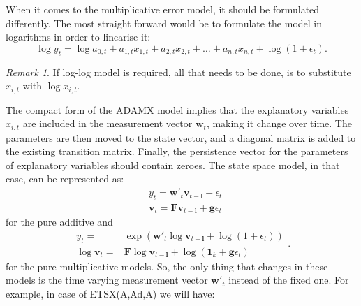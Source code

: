 \documentclass[
]{book}
\theoremstyle{definition}
\theoremstyle{definition}
\theoremstyle{definition}
\theoremstyle{definition}
\theoremstyle{remark}
\newtheorem*{remark}{Remark}
\begin{document}
When it comes to the multiplicative error model, it should be formulated differently. The most straight forward would be to formulate the model in logarithms in order to linearise it:
\begin{equation}
  \log {y}_{t} = \log a_{0,t} + a_{1,t} x_{1,t} + a_{2,t} x_{2,t} + \dots + a_{n,t} x_{n,t} + \log(1+ \epsilon_t).
  \label{eq:ETSXADAMStateSpacePureMultiplicativeMeasurement}
\end{equation}

\begin{remark}
If log-log model is required, all that needs to be done, is to substitute \(x_{i,t}\) with \(\log x_{i,t}\).
\end{remark}

The compact form of the ADAMX model implies that the explanatory variables \(x_{i,t}\) are included in the measurement vector \(\mathbf{w}_{t}\), making it change over time. The parameters are then moved to the state vector, and a diagonal matrix is added to the existing transition matrix. Finally, the persistence vector for the parameters of explanatory variables should contain zeroes. The state space model, in that case, can be represented as:
\begin{equation}
  \begin{aligned}
    & {y}_{t} = \mathbf{w}'_t \mathbf{v}_{t-\mathbf{l}} + \epsilon_t \\
    & \mathbf{v}_t = \mathbf{F} \mathbf{v}_{t-\mathbf{l}} + \mathbf{g} \epsilon_t
  \end{aligned}
  \label{eq:ETSXADAMStateSpacePureAdditiveFull}
\end{equation}
for the pure additive and
\begin{equation}
  \begin{aligned}
    {y}_{t} = & \exp\left(\mathbf{w}'_t \log \mathbf{v}_{t-\mathbf{l}} + \log(1 + \epsilon_t)\right) \\
    \log \mathbf{v}_t = & \mathbf{F} \log \mathbf{v}_{t-\mathbf{l}} + \log(\mathbf{1}_k + \mathbf{g} \epsilon_t)
  \end{aligned}. 
  \label{eq:ETSXADAMStateSpacePureMultiplicativeFull}
\end{equation}
for the pure multiplicative models. So, the only thing that changes in these models is the time varying measurement vector \(\mathbf{w}'_t\) instead of the fixed one. For example, in case of ETSX(A,Ad,A) we will have:
\end{document}
